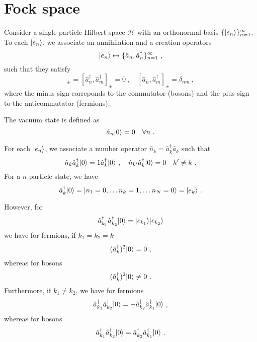\section{Fock space}

    Consider a single particle Hilbert space $\mathcal H$ with an orthonormal basis $\{\vert e_n\rangle\}_{n=1}^\infty$. To each $\vert e_n\rangle$, we associate an annihilation and a creation operators 
    \begin{equation*}
        \vert e_n\rangle \mapsto \{\hat a_n, \hat a_n^\dagger \}_{n=1}^\infty ~,
    \end{equation*}
    such that they satisfy 
    \begin{equation*}
        [\hat a_n, \hat a_m]_\pm = [\hat a_n^\dagger, \hat a_m^\dagger]_\pm = 0 ~, \quad [\hat a_n, \hat a_m^\dagger]_\pm = \delta_{nm} ~,
    \end{equation*}
    where the minus sign correponds to the commutator (bosons) and the plus sign to the anticommutator (fermions). 

    The vacuum state is defined as 
    \begin{equation*}
        \hat a_n \vert0\rangle = 0 \quad \forall n~.
    \end{equation*}

    For each $\vert e_n\rangle$, we associate a number operator $\hat n_k = \hat a_k^\dagger \hat a_k$ such that 
    \begin{equation*}
        \hat n_k \hat a_k^\dagger \vert0\rangle = 1 \hat a_k^\dagger \vert0\rangle ~, \quad \hat n_{k'} \hat a_k^\dagger \vert0\rangle = 0 \quad k' \neq k ~.
    \end{equation*}
    For a $n$ particle state, we have 
    \begin{equation*}
        \hat a_k^\dagger \vert0\rangle = \vert n_1=0, \ldots n_k=1, \ldots n_N=0\rangle = \vert e_k\rangle ~.
    \end{equation*}

    However, for 
    \begin{equation*}
        \hat a_{k_1}^\dagger \hat a_{k_2}^\dagger \vert0\rangle = \vert e_{k_1}\rangle \vert e_{k_2}\rangle 
    \end{equation*}
    we have for fermions, if $k_1 = k_2 = k$
    \begin{equation*}
    (\hat a^\dagger_k)^2 \vert0\rangle = 0 ~,
    \end{equation*}
    whereas for bosons 
    \begin{equation*}
        (\hat a^\dagger_k)^2 \vert0\rangle \neq 0 ~.
    \end{equation*}
    Furthermore, if $k_1 \neq  k_2$, we have for fermions
    \begin{equation*}
        \hat a^\dagger_{k_1} \hat a^\dagger_{k_2} \vert0\rangle = - \hat a^\dagger_{k_2} \hat a^\dagger_{k_1} \vert0\rangle ~,
    \end{equation*}
    whereas for bosons 
    \begin{equation*}
        \hat a^\dagger_{k_1} \hat a^\dagger_{k_2} \vert0\rangle = \hat a^\dagger_{k_2} \hat a^\dagger_{k_1} \vert0\rangle ~.
    \end{equation*}

